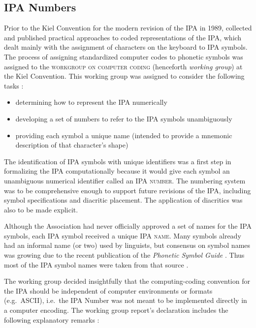 \subsection*{IPA Numbers}
Prior to the Kiel Convention for the modern revision of the IPA in 1989,
\citet{Wells1987} collected and published practical approaches to coded
representations of the IPA, which dealt mainly with the assignment of characters
on the keyboard to IPA symbols. The process of assigning standardized computer
codes to phonetic symbols was assigned to the \textsc{workgroup on computer
coding} (henceforth \textit{working group}) at the Kiel Convention. This working
group was assigned to consider the following tasks
\citep{Esling1990,EslingGaylord1993}: 

\begin{itemize}
	\item determining how to represent the IPA numerically
	\item developing a set of numbers to refer to the IPA symbols unambiguously
	\item providing each symbol a unique name (intended to provide a mnemonic description of that character's shape)
\end{itemize}

\noindent The identification of IPA symbols with unique identifiers was 
a first step in formalizing the IPA computationally because it would give 
each symbol an unambiguous numerical identifier called an \textsc{IPA number}. 
The numbering system was to be comprehensive enough to support future revisions 
of the IPA, including symbol specifications and diacritic placement. The 
application of diacritics was also to be made explicit. 

Although the Association had never officially approved a set of names 
for the IPA symbols, each IPA symbol received a unique \textsc{IPA name}. 
Many symbols already had an informal name (or two) used by linguists, but 
consensus on symbol names was growing due to the recent publication of the 
\textit{Phonetic Symbol Guide} \citep{PullumLadusaw1986}. Thus most of the 
IPA symbol names were taken from that source \citep[31]{IPA1999}.

The working group decided insightfully that the computing-coding convention 
for the IPA should be independent of computer environments or formats (e.g.\ ASCII), 
i.e.\ the IPA Number was not meant to be implemented directly in a computer 
encoding. The working group report's declaration includes the following explanatory 
remarks \citep[82]{International1989report}:

